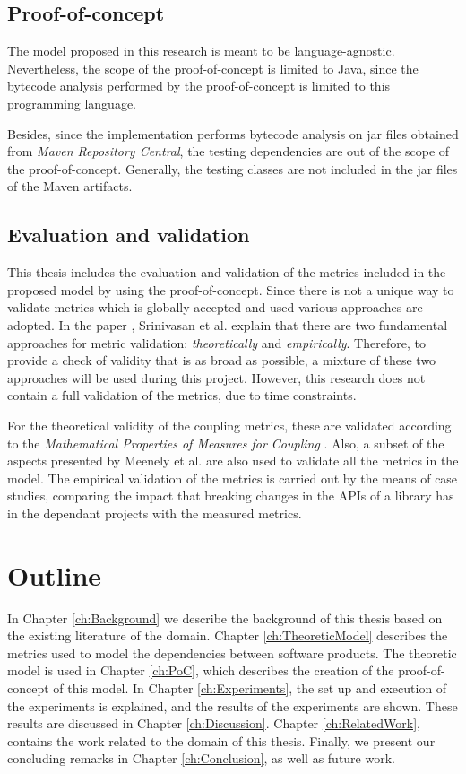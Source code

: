 \subsection{Proof-of-concept}
The model proposed in this research is meant to be language-agnostic. Nevertheless, the scope of the proof-of-concept is limited to Java, since the bytecode analysis performed by the proof-of-concept is limited to this programming language.

Besides, since the implementation performs bytecode analysis on jar files obtained from \textit{Maven Repository Central}, the testing dependencies are out of the scope of the proof-of-concept. Generally, the testing classes are not included in the jar files of the Maven artifacts.

\subsection{Evaluation and validation}
This thesis includes the evaluation and validation of the metrics included in the proposed model by using the proof-of-concept. Since there is not a unique way to validate metrics which is globally accepted and used various approaches are adopted. In the paper \cite{srinivasan2014software}, Srinivasan et al. explain that there are two fundamental approaches for metric validation: \textit{theoretically} and \textit{empirically}. Therefore, to provide a check of validity that is as broad as possible, a mixture of these two approaches will be used during this project. However, this research does not contain a full validation of the metrics, due to time constraints.

For the theoretical validity of the coupling metrics, these are validated according to the \textit{Mathematical Properties of Measures for Coupling} \cite{srinivasan2014software}. Also, a subset of the aspects presented by Meenely et al. \cite{meneely2013validating} are also used to validate all the metrics in the model.
The empirical validation of the metrics is carried out by the means of case studies, comparing the impact that breaking changes in the APIs of a library has in the dependant projects with the measured metrics.

\section{Outline}
In Chapter \ref{ch:Background} we describe the background of this thesis based on the existing literature of the domain.
Chapter \ref{ch:TheoreticModel} describes the metrics used to model the dependencies between software products.
The theoretic model is used in Chapter \ref{ch:PoC}, which describes the creation of the proof-of-concept of this model.
In Chapter \ref{ch:Experiments}, the set up and execution of the experiments is explained, and the results of the experiments are shown. These results are discussed in Chapter \ref{ch:Discussion}. Chapter \ref{ch:RelatedWork}, contains the work related to the domain of this thesis.
Finally, we present our concluding remarks in Chapter \ref{ch:Conclusion}, as well as future work.

